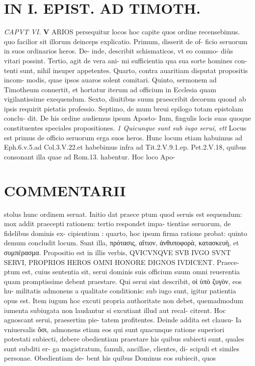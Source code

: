 \documentclass{article}
\begin{document}
\begin{pages}
\section*{IN I. EPIST. AD TIMOTH. }
\marginpar{[ p.143 ]}
\textit{CAPVT VI. }
\textbf{V }\pstart ARIOS persequitur locos hoc capite quos ordine recensebimus. quo facilior sit illorum deinceps explicatio. Primum, disserit de of- ficio seruorum in suos ordinarios heros. De- inde, describit schismaticos, vt eo commo- diùs vitari possint. Tertio, agit de vera ani- mi sufficientia qua sua sorte homines con- tenti sunt, nihil insuper appetentes. Quarto, contra auaritiam disputat propositis incom- modis, quae ipsos auaros solent comitari. Quinto, sermonem ad Timotheum conuertit, et hortatur iterum ad officium in Ecclesia quam vigilantissime exequendum. Sexto, diuitibus suum praescribit decorum quond ab ipsis requirit pietatis professio. Septimo, de mum breui epilogo totam epistolam conclu- dit. De his ordine audiemus ipsum Aposto- Ium, fingulis locis suas quoque constituentes speciales propositiones.  \pend
\textit{1 Quicunque sunt sub iugo serui, ett }\pstart Locus est primus de officio seruorum erga suos heros. Hunc locum etiam habuimus ad Eph.6.v.5.ad Col.3.V.22.et habebimus infra ad Tit.2.V.9.1.ep. Pet.2.V.18, quibus consonant illa quae ad Rom.13. habentur. Hoc loco Apo-  \pend
\marginpar{[ p.144 ]}
\section*{COMMENTARII }\pstart stolus hunc ordinem seruat. Initio dat praece ptum quod seruis est sequendum: mox addit praecepti rationem: tertio respondet impa- tientiae seruorum, de fidelibus dominis ex- cipientium : quarto, hoc ipsum firma ratione probat: quinto demum concludit locum. Sunt illa, πρότασις, αἴτιον, ἀνθυποφορὰ, κατασκευὴ, et συμπέρασμα.  \pend\pstart Propositio est in illis verbis, QVICVNQVE SVB IVGO SVNT SERVI, PROPRIOS HEROS OMNI HONORE DIGNOS IVDICENT. Praece- ptum est, cuius sententia sit, serui dominis suis officium suum omni reuerentia quam promptissime debent praestare.  \pend\pstart Qui serui sint describit, οἱ ὑπὸ ζυγὸν, eos hu- militatis admonens a qualitate conditionis: sub iugo sunt, igitur patientia opus est. Item iugum hoc excuti propria authoritate non debet, quemadmodum iumenta subiugata non laudantur si excutiant illud aut recal- citrent. Hoc agnoscant serui, praesertim pie- tatem profitentes. Deinde addita est clausu- Ia vniuersalis ὅσι, admonens etiam eos qui sunt quacunque ratione superiori potestati subiecti, debere obedientiam praestare his quibus subiecti sunt, quales sunt subditi er- ga magistratum, famuli, ancillae, clientes, di- scipuli et similes personae. Obedientiam de- bent his quibus Dominus eos subiecit, quos  \pend

\end{pages}
\end{document}

